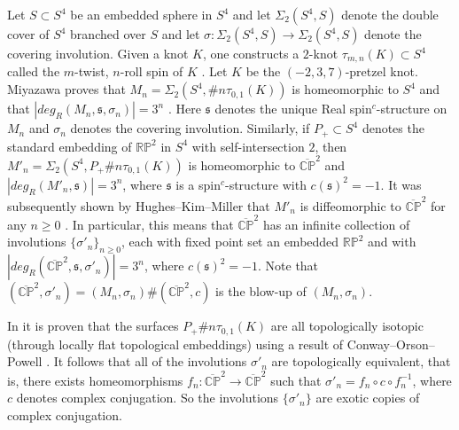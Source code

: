 \documentclass{amsart}
\theoremstyle{definition}
\theoremstyle{remark}
\numberwithin{equation}{section}
\begin{document}
Let $S \subset S^4$ be an embedded sphere in $S^4$ and let $\Sigma_2( S^4 , S )$ denote the double cover of $S^4$ branched over $S$ and let $\sigma : \Sigma_2(S^4 , S) \to \Sigma_2(S^4 , S)$ denote the covering involution. Given a knot $K$, one constructs a $2$-knot $\tau_{m,n}(K) \subset S^4$ called the $m$-twist, $n$-roll spin of $K$ \cite{lit}. Let $K$ be the $(-2,3,7)$-pretzel knot. Miyazawa proves that $M_n = \Sigma_2( S^4 , \# n \tau_{0,1}(K))$ is homeomorphic to $S^4$ and that $|deg_R( M_n , \mathfrak{s} , \sigma_n)| = 3^n$ \cite{mi}. Here $\mathfrak{s}$ denotes the unique Real spin$^c$-structure on $M_n$ and $\sigma_n$ denotes the covering involution. Similarly, if $P_+ \subset S^4$ denotes the standard embedding of $\mathbb{RP}^2$ in $S^4$ with self-intersection $2$, then $M'_n = \Sigma_2(S^4 , P_+ \# n \tau_{0,1}(K))$ is homeomorphic to $\overline{\mathbb{CP}}^2$ and $|deg_R( M'_n , \mathfrak{s} )| = 3^n$, where $\mathfrak{s}$ is a spin$^c$-structure with $c(\mathfrak{s})^2 = -1$. It was subsequently shown by Hughes--Kim--Miller that $M'_n$ is diffeomorphic to $\overline{\mathbb{CP}}^2$ for any $n \ge 0$ \cite{hkm}. In particular, this means that $\overline{\mathbb{CP}}^2$ has an infinite collection of involutions $\{ \sigma'_n \}_{n \ge 0}$, each with fixed point set an embedded $\mathbb{RP}^2$ and with $|deg_R( \overline{\mathbb{CP}}^2 , \mathfrak{s} , \sigma'_n)| = 3^n$, where $c(\mathfrak{s})^2 = -1$. Note that $(\overline{\mathbb{CP}}^2 , \sigma'_n) = (M_n , \sigma_n) \# (\overline{\mathbb{CP}}^2 , c)$ is the blow-up of $(M_n , \sigma_n)$. 

In \cite{mi} it is proven that the surfaces $P_+ \# n \tau_{0,1}(K)$ are all topologically isotopic (through locally flat topological embeddings) using a result of Conway--Orson--Powell \cite{cop}. It follows that all of the involutions $\sigma'_n$ are topologically equivalent, that is, there exists homeomorphisms $f_n : \overline{\mathbb{CP}}^2 \to \overline{\mathbb{CP}}^2$ such that $\sigma'_n = f_n \circ c \circ f_n^{-1}$, where $c$ denotes complex conjugation. So the involutions $\{\sigma'_n\}$ are exotic copies of complex conjugation.
\end{document}
